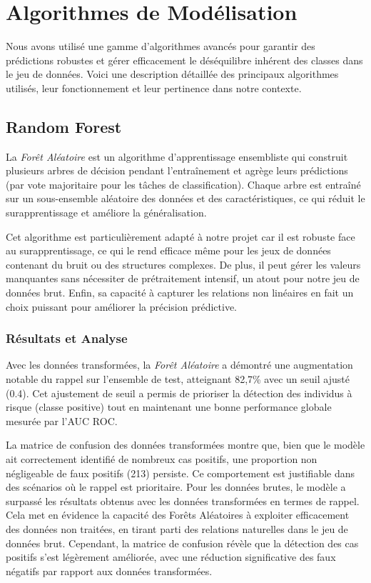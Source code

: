 \documentclass[a4paper,12pt]{report}
\begin{document}
\section{Algorithmes de Modélisation}

Nous avons utilisé une gamme d'algorithmes avancés pour garantir des prédictions robustes et gérer efficacement le déséquilibre inhérent des classes dans le jeu de données. Voici une description détaillée des principaux algorithmes utilisés, leur fonctionnement et leur pertinence dans notre contexte.

\subsection{Random Forest}

La \textit{Forêt Aléatoire} est un algorithme d'apprentissage ensembliste qui construit plusieurs arbres de décision pendant l'entraînement et agrège leurs prédictions (par vote majoritaire pour les tâches de classification). Chaque arbre est entraîné sur un sous-ensemble aléatoire des données et des caractéristiques, ce qui réduit le surapprentissage et améliore la généralisation.

Cet algorithme est particulièrement adapté à notre projet car il est robuste face au surapprentissage, ce qui le rend efficace même pour les jeux de données contenant du bruit ou des structures complexes. De plus, il peut gérer les valeurs manquantes sans nécessiter de prétraitement intensif, un atout pour notre jeu de données brut. Enfin, sa capacité à capturer les relations non linéaires en fait un choix puissant pour améliorer la précision prédictive.

\subsubsection{Résultats et Analyse}

Avec les données transformées, la \textit{Forêt Aléatoire} a démontré une augmentation notable du rappel sur l'ensemble de test, atteignant 82,7\% avec un seuil ajusté (0.4). Cet ajustement de seuil a permis de prioriser la détection des individus à risque (classe positive) tout en maintenant une bonne performance globale mesurée par l'AUC ROC.

La matrice de confusion des données transformées montre que, bien que le modèle ait correctement identifié de nombreux cas positifs, une proportion non négligeable de faux positifs (213) persiste. Ce comportement est justifiable dans des scénarios où le rappel est prioritaire.
\bigbreak
Pour les données brutes, le modèle a surpassé les résultats obtenus avec les données transformées en termes de rappel. Cela met en évidence la capacité des Forêts Aléatoires à exploiter efficacement des données non traitées, en tirant parti des relations naturelles dans le jeu de données brut. Cependant, la matrice de confusion révèle que la détection des cas positifs s'est légèrement améliorée, avec une réduction significative des faux négatifs par rapport aux données transformées.
\end{document}
